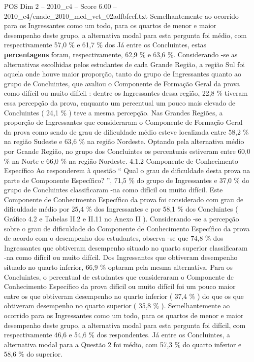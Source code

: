 \begin{textsample}{POS Dim 2 – 2010\_c4 – Score 6.00 – 2010\_c4/enade\_2010\_med\_vet\_02adfbfccf.txt}
Semelhantemente ao ocorrido para os Ingressantes como um todo, para os quartos de menor e maior desempenho deste grupo, a alternativa modal para esta pergunta foi médio, com respectivamente 57,0 \% e 61,7 \% dos Já entre os Concluintes, estas \textbf{percentagens} foram, respectivamente, 62,9 \% e 63,6 \%.
Considerando -se as alternativas escolhidas pelos estudantes de cada Grande Região, a região Sul foi aquela onde houve maior proporção, tanto do grupo de Ingressantes quanto ao grupo de Concluintes, que avaliou o Componente de Formação Geral da prova como difícil ou muito difícil : dentre os Ingressantes dessa região, 22,8 \% tiveram essa percepção da prova, enquanto um percentual um pouco mais elevado de Concluintes ( 24,1 \% ) teve a mesma percepção.
Nas Grandes Regiões, a proporção de Ingressantes que consideraram o Componente de Formação Geral da prova como sendo de grau de dificuldade médio esteve localizada entre 58,2 \% na região Sudeste e 63,6 \% na região Nordeste.
Optando pela alternativa médio por Grande Região, no grupo dos Concluintes os percentuais estiveram entre 60,0 \% na Norte e 66,0 \% na região Nordeste. 4.1.2 Componente de Conhecimento Específico Ao responderem à questão “ Qual o grau de dificuldade desta prova na parte de Componente Específico? ”, 71,5 \% do grupo de Ingressantes e 37,0 \% do grupo de Concluintes classificaram -na como difícil ou muito difícil.
Este Componente de Conhecimento Específico da prova foi considerado com grau de dificuldade médio por 25,4 \% dos Ingressantes e por 58,1 \% dos Concluintes ( Gráfico 4.2 e Tabelas II.2 e II.11 no Anexo II ).
Considerando -se a percepção sobre o grau de dificuldade do Componente de Conhecimento Específico da prova de acordo com o desempenho dos estudantes, observa -se que 74,8 \% dos Ingressantes que obtiveram desempenho situado no quarto superior classificaram -na como difícil ou muito difícil.
Dos Ingressantes que obtiveram desempenho situado no quarto inferior, 66,9 \% optaram pela mesma alternativa.
Para os Concluintes, o percentual de estudantes que consideraram o Componente de Conhecimento Específico da prova difícil ou muito difícil foi um pouco maior entre os que obtiveram desempenho no quarto inferior ( 37,4 \% ) do que os que obtiveram desempenho no quarto superior ( 35,8 \% ).
Semelhantemente ao ocorrido para os Ingressantes como um todo, para os quartos de menor e maior desempenho deste grupo, a alternativa modal para esta pergunta foi difícil, com respectivamente 46,6 e 54,6 \% dos respondentes.
Já entre os Concluintes, a alternativa modal para a Questão 2 foi médio, com 57,3 \% do quarto inferior e 58,6 \% do superior.

\end{textsample}
